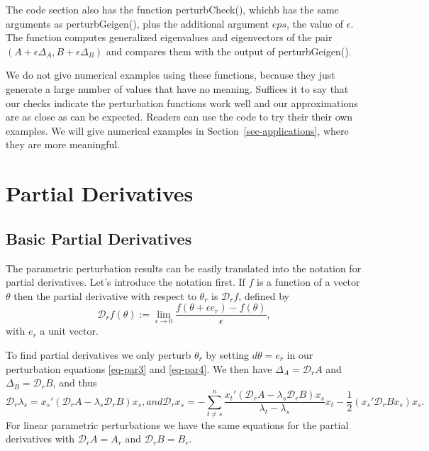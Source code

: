 \documentclass[
  12pt,
  letterpaper,
  DIV=11,
  numbers=noendperiod]{scrartcl}
\newcommand{\sectionbreak}{\clearpage}
\begin{document}
The code section also has the function perturbCheck(), whichb has the
same arguments as perturbGeigen(), plus the additional argument \(eps\),
the value of \(\epsilon\). The function computes generalized eigenvalues
and eigenvectors of the pair
\((A+\epsilon\Delta_A, B+\epsilon\Delta_B)\) and compares them with the
output of perturbGeigen().

We do not give numerical examples using these functions, because they
just generate a large number of values that have no meaning. Suffices it
to say that our checks indicate the perturbation functions work well and
our approximations are as close as can be expected. Readers can use the
code to try their their own examples. We will give numerical examples in
Section~\ref{sec-applications}, where they are more meaningful.

\sectionbreak

\section{Partial Derivatives}\label{sec-partial}

\subsection{Basic Partial Derivatives}\label{sec-parbasic}

The parametric perturbation results can be easily translated into the
notation for partial derivatives. Let's introduce the notation first. If
\(f\) is a function of a vector \(\theta\) then the partial derivative
with respect to \(\theta_r\) is \(\mathcal{D}_rf\), defined by
\begin{equation}
\mathcal{D}_rf(\theta):=\lim_{\epsilon\rightarrow 0}\frac{f(\theta+\epsilon e_r)-f(\theta)}{\epsilon},\label{eq-parderdef}
\end{equation} with \(e_r\) a unit vector.

To find partial derivatives we only perturb \(\theta_r\) by setting
\(d\theta=e_r\) in our perturbation equations \eqref{eq-par3} and
\eqref{eq-par4}. We then have \(\Delta_A=\mathcal{D}_rA\) and
\(\Delta_B=\mathcal{D}_rB\), and thus \begin{subequations}
\begin{equation}
\mathcal{D}_r\lambda_s=x_s'(\mathcal{D}_rA-\lambda_s\mathcal{D}_rB)x_s,\label{eq-parper1}
\end{equation}
and
\begin{equation}
\mathcal{D}_rx_s=-\sum_{t\not= s}^n\frac{x_t'(\mathcal{D}_rA-\lambda_s\mathcal{D}_rB)x_s}{\lambda_t-\lambda_s}x_t-\frac12(x_s'\mathcal{D}_rBx_s)x_s.\label{eq-parper2}
\end{equation}
\end{subequations} For linear parametric perturbations we have the same
equations for the partial derivatives with \(\mathcal{D}_rA=A_r\) and
\(\mathcal{D}_rB=B_r\).
\end{document}
